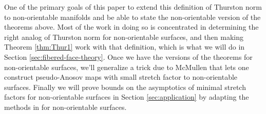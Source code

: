 One of the primary goals of this paper to extend this definition of Thurston norm to non-orientable manifolds
and be able to state the non-orientable version of the theorems above. Most of the work in doing so is
concentrated in determining the right analog of Thurston norm for non-orientable surfaces, and then making
Theorem \ref{thm:Thur1} work with that definition, which is what we will do in Section \ref{sec:fibered-face-theory}. Once we have the
versions of the theorems for non-orientable surfaces, we'll generalize a trick due
to McMullen that lets one construct pseudo-Anosov maps with small stretch factor to non-orientable surfaces. Finally we will prove
bounds on the asymptotics of minimal stretch factors for non-orientable surfaces in Section
\ref{sec:application} by adapting the methods in \cite{yazdi2018pseudo} for non-orientable surfaces.